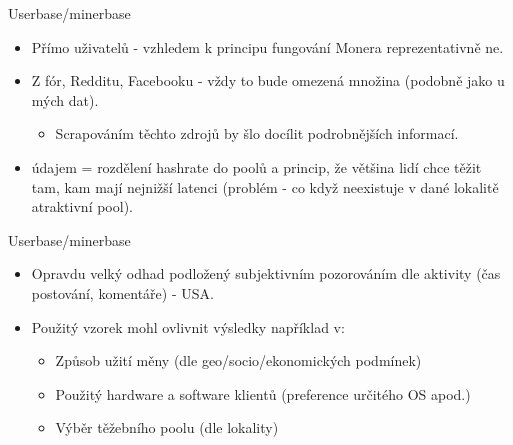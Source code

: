 \documentclass{beamer}
\begin{document}
\begin{darkframes}
        \begin{frame}{Userbase/minerbase}
     \color{aquamarine}
\begin{itemize}
\item Přímo uživatelů - vzhledem k principu fungování Monera reprezentativně ne.
\item Z fór, Redditu, Facebooku - vždy to bude omezená množina (podobně jako u mých dat).
\begin{itemize}
\item Scrapováním těchto zdrojů by šlo docílit podrobnějších informací.
\end{itemize}
\item {} údajem = rozdělení hashrate do poolů a princip, že většina lidí chce těžit tam, kam mají nejnižší latenci (problém - co když neexistuje v dané lokalitě atraktivní pool).
\end{itemize}
    \end{frame}
    
            \begin{frame}{Userbase/minerbase}
     \color{aquamarine}
\begin{itemize}
\item Opravdu velký odhad podložený subjektivním pozorováním dle aktivity (čas postování, komentáře) - USA.
\item Použitý vzorek mohl ovlivnit výsledky například v:
\begin{itemize}
\item Způsob užití měny (dle geo/socio/ekonomických podmínek)
\item Použitý hardware a software klientů (preference určitého OS apod.)
\item Výběr těžebního poolu (dle lokality)
\end{itemize}
\end{itemize}
    \end{frame}
    


\end{darkframes}
\end{document}
